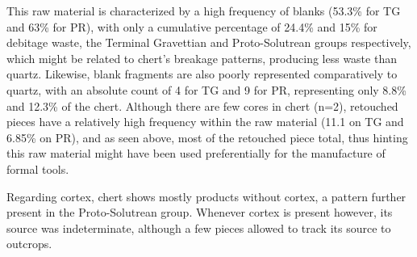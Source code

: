 \documentclass[12pt,twoside]{reedthesis}
\begin{document}
This raw material is characterized by a high frequency of blanks (53.3\% for TG and 63\% for PR), with only a cumulative percentage of 24.4\% and 15\% for debitage waste, the Terminal Gravettian and Proto-Solutrean groups respectively, which might be related to chert's breakage patterns, producing less waste than quartz. Likewise, blank fragments are also poorly represented comparatively to quartz, with an absolute count of 4 for TG and 9 for PR, representing only 8.8\% and 12.3\% of the chert. Although there are few cores in chert (n=2), retouched pieces have a relatively high frequency within the raw material (11.1 on TG and 6.85\% on PR), and as seen above, most of the retouched piece total, thus hinting this raw material might have been used preferentially for the manufacture of formal tools.

Regarding cortex, chert shows mostly products without cortex, a pattern further present in the Proto-Solutrean group. Whenever cortex is present however, its source was indeterminate, although a few pieces allowed to track its source to outcrops.
\end{document}
